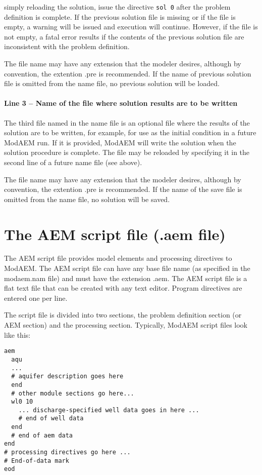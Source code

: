 simply reloading the solution, issue the directive \texttt{sol~0}
after the problem definition is complete. If the previous solution
file is missing or if the file is empty, a warning will be issued
and execution will continue. However, if the file is not empty, a
fatal error results if the contents of the previous solution file
are inconsistent with the problem definition.

The file name may have any extension that the modeler desires, although
by convention, the extention \textsf{.pre} is recommended. If the
name of previous solution file is omitted from the name file, no previous
solution will be loaded.


\paragraph{Line 3 -- Name of the file where solution results are to be written}

The third file named in the name file is an optional file where the
results of the solution are to be written, for example, for use as
the initial condition in a future ModAEM run. If it is provided, ModAEM
will write the solution when the solution procedure is complete. The
file may be reloaded by specifying it in the second line of a future
name file (see above). 

The file name may have any extension that the modeler desires, although
by convention, the extention \textsf{.pre} is recommended. If the
name of the save file is omitted from the name file, no solution will
be saved.


\section{The AEM script file (\textsf{.}\textsf{\textmd{aem}} file) }

The AEM script file provides model elements and processing directives
to ModAEM. The AEM script file can have any base file name (as specified
in the modaem.nam file) and must have the extension \textsf{.aem}.
The AEM script file is a flat text file that can be created with any
text editor. Program directives are entered one per line.

The script file is divided into two sections, the problem
definition section (or AEM section)
and the processing section. Typically,
ModAEM script files look like this:
\begin{verbatim}
aem
  aqu
  ...
  # aquifer description goes here
  end
  # other module sections go here...
  wl0 10
    ... discharge-specified well data goes in here ...
    # end of well data 
  end 
  # end of aem data 
end
# processing directives go here ...
# End-of-data mark 
eod
\end{verbatim}

